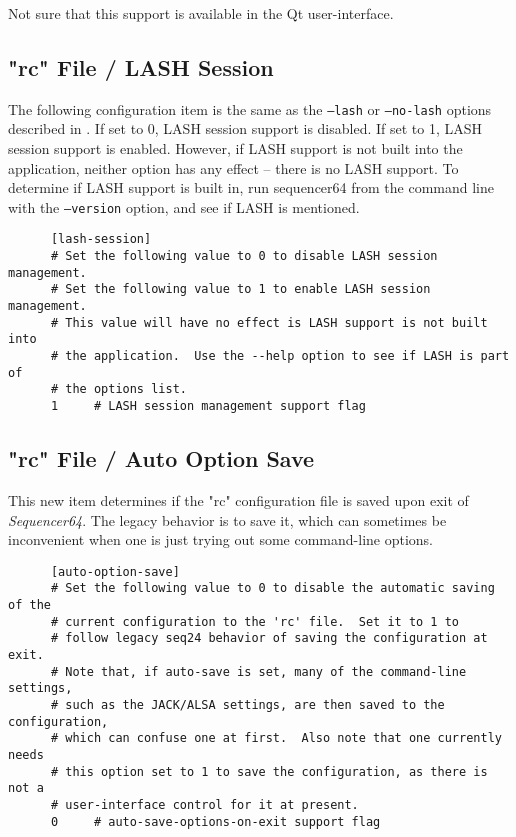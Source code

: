    Not sure that this support is available in the Qt user-interface.

\subsection{"rc" File / LASH Session}
\label{subsec:seq64_rc_file_lash_session}

   The following configuration item is the same as the
   \texttt{--lash} or \texttt{--no-lash} options described in
   .
   If set to 0, LASH session support is disabled.
   If set to 1, LASH session support is enabled.
   However, if LASH support is not built into the application, neither option
   has any effect -- there is no LASH support.  
   To determine if LASH support is built in, run sequencer64 from the command
   line with the \texttt{--version} option, and see if LASH is mentioned.

   \begin{verbatim}
      [lash-session]
      # Set the following value to 0 to disable LASH session management.
      # Set the following value to 1 to enable LASH session management.
      # This value will have no effect is LASH support is not built into
      # the application.  Use the --help option to see if LASH is part of
      # the options list.
      1     # LASH session management support flag
   \end{verbatim}

\subsection{"rc" File / Auto Option Save}
\label{subsec:seq64_rc_file_auto_rc_save}

   This new item determines if the "rc" configuration file is saved
   upon exit of \textsl{Sequencer64}.  The legacy behavior is to save it,
   which can sometimes be inconvenient when one is just trying out some
   command-line options.

   \begin{verbatim}
      [auto-option-save]
      # Set the following value to 0 to disable the automatic saving of the
      # current configuration to the 'rc' file.  Set it to 1 to
      # follow legacy seq24 behavior of saving the configuration at exit.
      # Note that, if auto-save is set, many of the command-line settings,
      # such as the JACK/ALSA settings, are then saved to the configuration,
      # which can confuse one at first.  Also note that one currently needs
      # this option set to 1 to save the configuration, as there is not a
      # user-interface control for it at present.
      0     # auto-save-options-on-exit support flag
   \end{verbatim}

